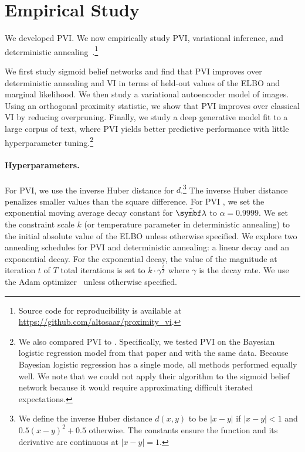 \section{Empirical Study}
\label{sec:case-study}
\label{sec:pvi-experiments}

We developed \acrfull{PVI}. We now empirically study \gls{PVI}, variational inference, and deterministic annealing~\citep{Katihara:2008}.\footnote{Source code for reproducibility is available at \url{https://github.com/altosaar/proximity_vi}.}

We first study sigmoid belief networks and find that \gls{PVI} improves over deterministic annealing and \gls{VI} in terms of held-out values of the \gls{ELBO} and marginal likelihood. We then study a variational autoencoder model of images.  Using an orthogonal proximity statistic, we show that \gls{PVI} improves over classical \gls{VI} by reducing overpruning. Finally, we study a deep generative model fit to a large corpus of text, where \gls{PVI} yields better predictive performance with little hyperparameter tuning.\footnote{We also compared \gls{PVI} to \citet{khan2015kullback}. Specifically, we tested \gls{PVI} on the Bayesian logistic regression model from that paper and with the same data.  Because Bayesian logistic regression has a single mode, all   methods performed equally well.  We note that we could not apply their algorithm to the sigmoid belief network because it would require approximating difficult iterated expectations.}

\paragraph{Hyperparameters.} For \gls{PVI}, we use the inverse Huber distance for $d$.\footnote{We define the inverse Huber distance   $d(x, y)$ to be $|x - y|$ if $|x - y| < 1$ and $0.5(x-y)^2 + 0.5$   otherwise. The constants ensure the function and its derivative are   continuous at $|x-y| = 1$.} The inverse Huber distance penalizes smaller values than the square difference. For \gls{PVI} , we set the exponential moving average decay constant for $\tmblambda$ to $\alpha=0.9999$. We set the constraint scale $k$ (or temperature parameter in deterministic annealing) to the initial absolute value of the \gls{ELBO} unless otherwise specified. We explore two annealing schedules for \gls{PVI} and deterministic annealing: a linear decay and an exponential decay. For the exponential decay, the value of the magnitude at iteration $t$ of $T$ total iterations is set to $k\cdot \gamma^{\frac{t}{T}}$ where $\gamma$ is the decay rate. We use the Adam optimizer~\citep{kingma2015adam:} unless otherwise specified.
